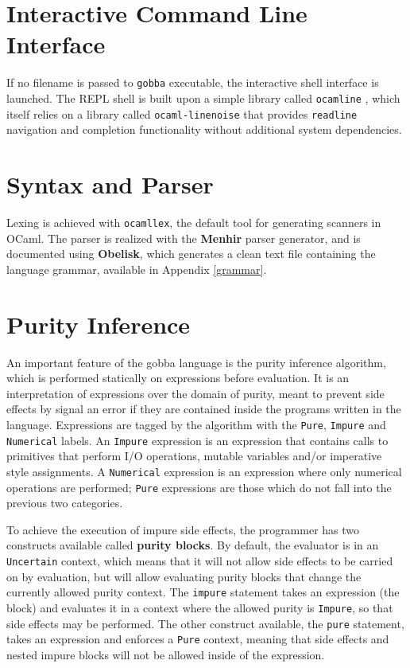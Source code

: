 \documentclass[a4paper, 10pt]{article}
\theoremstyle{plain}%
\theoremstyle{definition}
\theoremstyle{remark}
\begin{document}
\clearpage

\begin{multicols}{2}

\section{Interactive Command Line Interface}
If no filename is passed to \texttt{gobba} executable, the interactive shell
interface is launched. The REPL shell is built upon a simple library called
\texttt{ocamline} \cite{ocamline}, which itself relies on a library called
\texttt{ocaml-linenoise} \cite{linenoise} that provides \texttt{readline}
navigation and completion functionality without additional system
dependencies.

\section{Syntax and Parser}
Lexing is achieved with \texttt{ocamllex}, the default tool for generating
scanners in OCaml.
The parser is realized with the \textbf{Menhir} parser generator, and is
documented using \textbf{Obelisk}, which generates a clean text file
containing the language grammar, available in Appendix \ref{grammar}.

\section{Purity Inference}
An important feature of the gobba language is the purity inference algorithm,
which is performed statically on expressions before evaluation. It is an interpretation of expressions over the domain of purity, meant to
prevent side effects by signal an error if they are contained inside the
programs written in the language. Expressions are tagged by the algorithm with
the \texttt{Pure}, \texttt{Impure} and \texttt{Numerical} labels. An
\texttt{Impure} expression is an expression that contains calls to primitives
that perform I/O operations, mutable variables and/or imperative style
assignments. A \texttt{Numerical} expression is an expression where only
numerical operations are performed; \texttt{Pure} expressions are those which do not fall into the previous two
categories.

To achieve the execution of impure side effects, the programmer has two constructs
available called \textbf{purity blocks}. By default, the evaluator is in an
\texttt{Uncertain} context, which means that it will not allow side effects to
be carried on by evaluation, but will allow evaluating purity blocks that change
the currently allowed purity context. The \texttt{impure} statement takes an
expression (the block) and evaluates it in a context where the allowed purity is
\texttt{Impure}, so that side effects may be performed. The other construct
available, the \texttt{pure} statement, takes an expression and enforces a
\texttt{Pure} context, meaning that side effects and nested impure blocks will
not be allowed inside of the expression.


\end{multicols}
\end{document}
